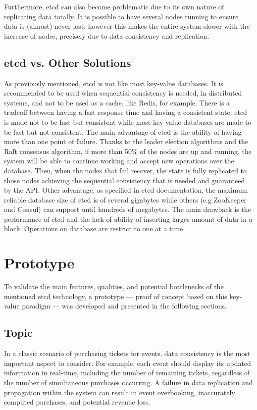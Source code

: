 \documentclass[screen,review]{acmart}
\begin{document}
Furthermore, etcd can also become problematic due to its own nature of replicating data totally. It is possible to have several nodes running to ensure data is (almost) never lost, however this makes the entire system slower with the increase of nodes, precisely due to data consistency and replication.

\subsection{etcd vs. Other Solutions}
As previously mentioned, etcd is not like most key-value databases. It is recommended to be used when sequential consistency is needed, in distributed systems, and not to be used as a cache, like Redis, for example. There is a tradeoff between having a fast response time and having a consistent state. etcd is made not to be fast but consistent while most key-value databases are made to be fast but not consistent.
The main advantage of etcd is the ability of having more than one point of failure. Thanks to the leader election algorithms and the Raft consensus algorithm, if more than 50\% of the nodes are up and running, the system will be able to continue working and accept new operations over the database. Then, when the nodes that fail recover, the state is fully replicated to those nodes achieving the sequential consistency that is needed and guaranteed by the API.
Other advantage, as specified in etcd documentation, the maximum reliable database size of etcd is of several gigabytes while others (e.g ZooKeeper and Consul) can support until hundreds of megabytes.
The main drawback is the performance of etcd and the lack of ability of inserting larges amount of data in a block. Operations on database are restrict to one at a time.

\section{Prototype}
To validate the main features, qualities, and potential bottlenecks of the mentioned etcd technology, a prototype — proof of concept based on this key-value paradigm — was developed and presented in the following sections.

\subsection{Topic}
In a classic scenario of purchasing tickets for events, data consistency is the most important aspect to consider. For example, each event should display its updated information in real-time, including the number of remaining tickets, regardless of the number of simultaneous purchases occurring. A failure in data replication and propagation within the system can result in event overbooking, inaccurately computed purchases, and potential revenue loss.
\end{document}

